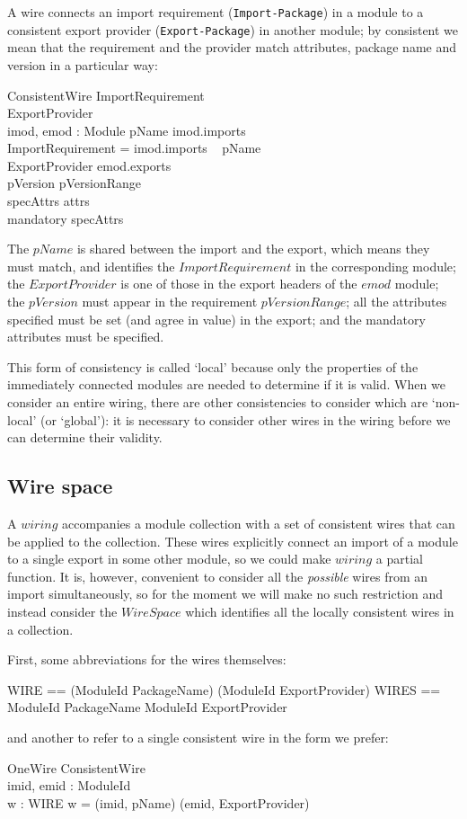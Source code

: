 \documentclass[a4paper,12pt]{article}
\begin{document}
A wire connects an import requirement ({\tt Import-Package}) in a module to a consistent export provider 
({\tt Export-Package}) in another module; by consistent we mean that the requirement and the provider match attributes, package name and version in a particular way:
\begin{schema}{ConsistentWire}
	ImportRequirement	\\
	ExportProvider		\\
	imod, emod : Module
\where
	pName \in \dom imod.imports		\\
	\theta ImportRequirement = imod.imports ~ pName \\
	\theta ExportProvider \in emod.exports \\
	pVersion \in pVersionRange \\
	specAttrs \subseteq attrs \\
	mandatory \subseteq \dom specAttrs
\end{schema}
The $pName$ is shared between the import and the export, which means they must match, and identifies the $ImportRequirement$ in the corresponding module; the $ExportProvider$ is one of those in the export headers of the $emod$ module; the $pVersion$ must appear in the requirement $pVersionRange$; all the attributes specified must be set (and agree in value) in the export; and the mandatory attributes must be specified.

This form of consistency is called `local' because only the properties of the immediately connected modules are needed to determine if it is valid. When we consider an entire wiring, there are other consistencies to consider which are `non-local' (or `global'): it is necessary to consider  other wires in the wiring before we can determine their validity.

\subsection{Wire space}
A $wiring$ accompanies a module collection with a set of consistent wires that can be applied to the collection. These wires explicitly connect an import of a module to a single export in some other module, so we could make $wiring$ a partial function. It is, however, convenient to consider all the \emph{possible} wires from an import simultaneously, so for the moment we will make no such restriction and instead consider the $WireSpace$ which identifies all the locally consistent wires in a collection. 

First, some abbreviations for the wires themselves:
\begin{zed}
	WIRE == (ModuleId \cross PackageName)  \cross (ModuleId \cross ExportProvider)
\also	
	WIRES == ModuleId \cross PackageName \rel ModuleId \cross ExportProvider
\end{zed}
and another to refer to a single consistent wire in the form we prefer:
\begin{schema}{OneWire}
	ConsistentWire		\\
	imid, emid : ModuleId	\\
	w : WIRE
\where
	w = (imid, pName) \mapsto (emid, \theta ExportProvider)
\end{schema}
\end{document}
